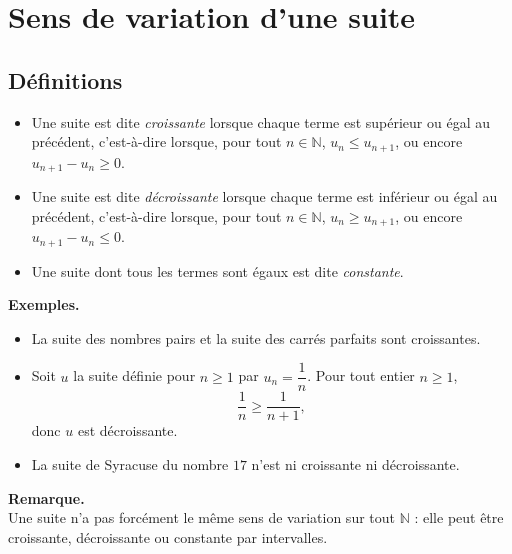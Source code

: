 \documentclass[11pt]{article}
\newcommand{\NN}{\mathbb{N}}
\newenvironment{remarque}{\par\smallskip\noindent\textbf{Remarque. \\}\ignorespaces}{\par\smallskip}
\newenvironment{exemples}{\par\smallskip\noindent\textbf{Exemples. \\}\ignorespaces}{\par\smallskip}
\begin{document}
\section{Sens de variation d'une suite}

\subsection{Définitions}

\begin{definition}
\begin{itemize}
    \item Une suite est dite \emph{croissante} lorsque chaque terme est supérieur ou égal au précédent, c'est-à-dire lorsque, pour tout $n\in\NN$, $u_n\leq u_{n+1}$, ou encore $u_{n+1}-u_n\geq0$.
    \item Une suite est dite \emph{décroissante} lorsque chaque terme est inférieur ou égal au précédent, c'est-à-dire lorsque, pour tout $n\in\NN$, $u_n\geq u_{n+1}$, ou encore $u_{n+1}-u_n\leq0$.
    \item Une suite dont tous les termes sont égaux est dite \emph{constante}.
\end{itemize}
\end{definition}

\begin{exemples}
\begin{itemize}
    \item La suite des nombres pairs et la suite des carrés parfaits sont croissantes.
    \item Soit $u$ la suite définie pour $n\geq1$ par $u_n=\dfrac{1}{n}$. Pour tout entier $n\geq1$,
    \[
    \frac{1}{n}\geq\frac{1}{n+1},
    \]
    donc $u$ est décroissante.
    \item La suite de Syracuse du nombre $17$ n'est ni croissante ni décroissante.
\end{itemize}
\end{exemples}

\begin{remarque}
Une suite n'a pas forcément le même sens de variation sur tout $\NN$ : elle peut être croissante, décroissante ou constante par intervalles.
\end{remarque}
\end{document}
